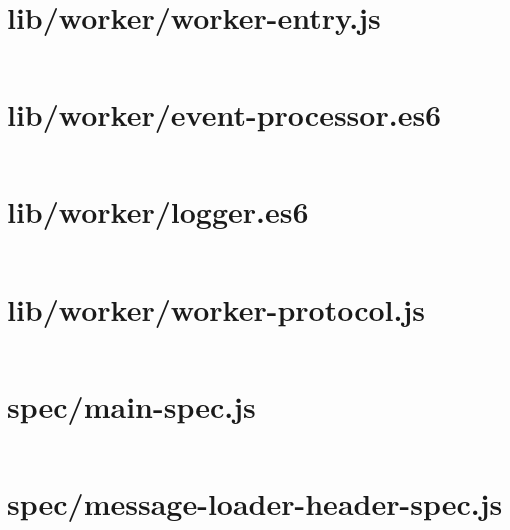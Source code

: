 \documentclass[10pt, letterpaper]{article}
\begin{document}
\section{lib/worker/worker-entry.js}
\inputminted{javascript}{/home/mbilker/.nylas/dev/packages/cypher/lib/worker/worker-entry.js}

\section{lib/worker/event-processor.es6}
\inputminted{javascript}{/home/mbilker/.nylas/dev/packages/cypher/lib/worker/event-processor.es6}

\section{lib/worker/logger.es6}
\inputminted{javascript}{/home/mbilker/.nylas/dev/packages/cypher/lib/worker/logger.es6}

\section{lib/worker/worker-protocol.js}
\inputminted{javascript}{/home/mbilker/.nylas/dev/packages/cypher/lib/worker/worker-protocol.js}

\section{spec/main-spec.js}
\inputminted{javascript}{/home/mbilker/.nylas/dev/packages/cypher/spec/main-spec.js}

\section{spec/message-loader-header-spec.js}
\inputminted{javascript}{/home/mbilker/.nylas/dev/packages/cypher/spec/message-loader-header-spec.js}

\end{document}
